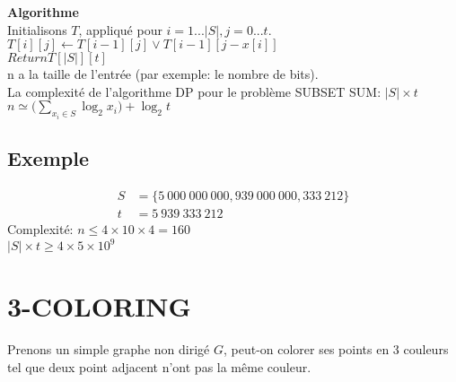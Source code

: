 \documentclass[a4paper,12pt]{article}
\begin{document}
  \textbf{Algorithme}\\
    Initialisons $T$, appliqué pour $i = 1 ... |S|, j = 0 ... t$.\\
    $T[i][j] \leftarrow T[i-1][j] \vee T[i-1][j-x[i]]$\\
    $Return T[|S|][t]$\\
    n a la taille de l'entrée (par exemple: le nombre de bits).\\
    La complexité de l'algorithme DP pour le problème SUBSET SUM: $|S| \times t$\\
    
    $n \simeq \big( \sum\limits_{x_i \in S} \log_2 x_i \big) + \log_2 t$\\
    
    \subsection{Exemple}
      \begin{align*}
	S &= \{5\ 000\ 000\ 000, 939\ 000\ 000, 333\ 212\}\\
	t &= 5\ 939\ 333\ 212
      \end{align*}
      Complexité: $n \leq 4 \times 10 \times 4 = 160$\\
      $|S| \times t \geq 4 \times 5 \times 10^9$
  
  
\section{3-COLORING}
  Prenons un simple graphe non dirigé $G$, peut-on colorer ses points en 3 couleurs tel que deux point adjacent n'ont pas la même couleur.
  
  \begin{center}
    \end{center}
    
\end{document}
